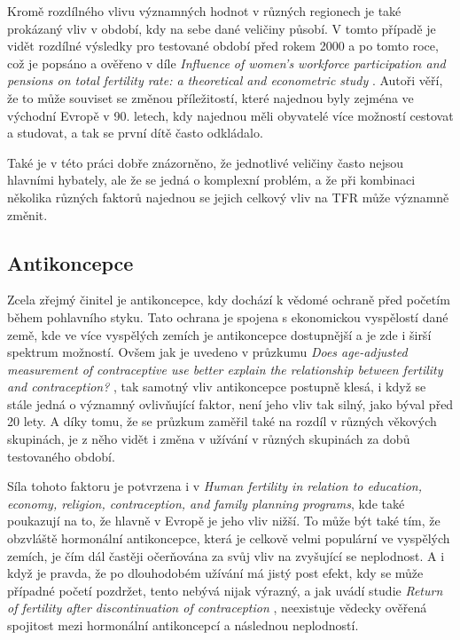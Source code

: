 \documentclass[thesis=M,czech]{FITthesis}[2022/10/08]
\begin{document}
Kromě rozdílného vlivu významných hodnot v různých regionech je také prokázaný vliv v období, kdy na sebe dané veličiny působí. V tomto případě je vidět rozdílné výsledky pro testované období před rokem 2000 a po tomto roce, což je popsáno a ověřeno v díle \textit{Influence of women’s workforce participation and pensions on total fertility rate: a theoretical and econometric study} \cite{Evan}. Autoři věří, že to může souviset se změnou příležitostí, které najednou byly zejména ve východní Evropě v 90. letech, kdy najednou měli obyvatelé více možností cestovat a studovat, a tak se první dítě často odkládalo.

Také je v této práci dobře znázorněno, že jednotlivé veličiny často nejsou hlavními hybately, ale že se jedná o komplexní problém, a že při kombinaci několika různých faktorů najednou se jejich celkový vliv na TFR může významně změnit.

\subsection{Antikoncepce}

Zcela zřejmý činitel je antikoncepce, kdy dochází k vědomé ochraně před početím během pohlavního styku. Tato ochrana je spojena s ekonomickou vyspělostí dané země, kde ve více vyspělých zemích je antikoncepce dostupnější a je zde i širší spektrum možností. Ovšem jak je uvedeno v průzkumu \textit{Does age-adjusted measurement of contraceptive use better explain the relationship between fertility and contraception?} \cite{CHOI}, tak samotný vliv antikoncepce postupně klesá, i když se stále jedná o významný ovlivňující faktor, není jeho vliv tak silný, jako býval před 20 lety. A díky tomu, že se průzkum zaměřil také na rozdíl v různých věkových skupinách, je z něho vidět i změna v užívání v různých skupinách za dobů testovaného období. 

Síla tohoto faktoru je potvrzena i v \textit{Human fertility in relation to education, economy, religion, contraception, and family planning programs}\cite{Götmark}, kde také poukazují na to, že hlavně v Evropě je jeho vliv nižší. To může být také tím, že obzvláště hormonální antikoncepce, která je celkově velmi populární ve vyspělých zemích, je čím dál častěji očerňována za svůj vliv na zvyšující se neplodnost. A i když je pravda, že po dlouhodobém užívání má jistý post efekt, kdy se může případné početí pozdržet, tento nebývá nijak výrazný, a jak uvádí studie \textit{Return of fertility after discontinuation of contraception} \cite{Girum}, neexistuje vědecky ověřená spojitost mezi hormonální antikoncepcí a následnou neplodností.
\end{document}
